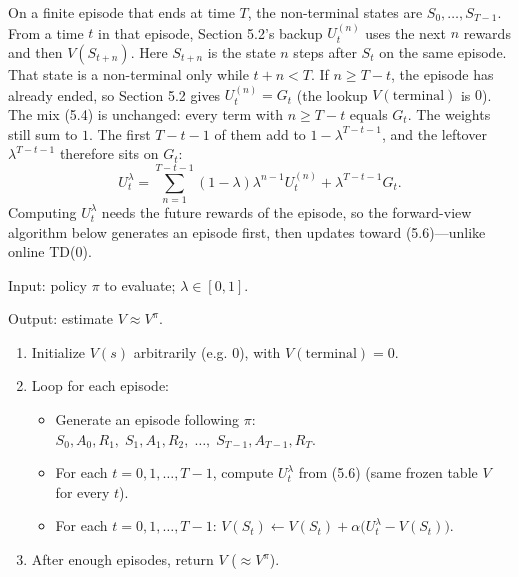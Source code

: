 On a finite episode that ends at time $T$, the non-terminal states are $S_0,\ldots,S_{T-1}$. From a time $t$ in that episode, Section 5.2's backup $U_t^{(n)}$ uses the next $n$ rewards and then $V(S_{t+n})$. Here $S_{t+n}$ is the state $n$ steps after $S_t$ on the same episode. That state is a non-terminal only while $t+n<T$. If $n\ge T{-}t$, the episode has already ended, so Section 5.2 gives $U_t^{(n)}=G_t$ (the lookup $V(\text{terminal})$ is $0$). The mix (5.4) is unchanged: every term with $n\ge T{-}t$ equals $G_t$. The weights still sum to $1$. The first $T{-}t{-}1$ of them add to $1-\lambda^{T-t-1}$, and the leftover $\lambda^{T-t-1}$ therefore sits on $G_t$:
\begin{equation}
U_t^{\lambda}
=
\sum_{n=1}^{T-t-1}(1-\lambda)\lambda^{n-1}U_t^{(n)}
+
\lambda^{T-t-1}G_t.
\tag{5.6}
\end{equation}
Computing $U_t^{\lambda}$ needs the future rewards of the episode, so the forward-view algorithm below generates an episode first, then updates toward (5.6)---unlike online TD(0).

\begin{implnote}
Input: policy $\pi$ to evaluate; $\lambda\in[0,1]$.

Output: estimate $V\approx V^\pi$.

\begin{enumerate}
\item Initialize $V(s)$ arbitrarily (e.g. $0$), with $V(\text{terminal})=0$.
\item Loop for each episode:
\begin{itemize}
\item Generate an episode following $\pi$:   $S_0,A_0,R_1,\;S_1,A_1,R_2,\;\ldots,\;S_{T-1},A_{T-1},R_T$.
\item For each $t=0,1,\ldots,T{-}1$, compute $U_t^{\lambda}$ from (5.6) (same frozen table $V$ for every $t$).
\item For each $t=0,1,\ldots,T{-}1$:   $V(S_t)\leftarrow V(S_t)+\alpha\bigl(U_t^{\lambda}-V(S_t)\bigr)$.
\end{itemize}
\item After enough episodes, return $V$ ($\approx V^\pi$).
\end{enumerate}

\end{implnote}




